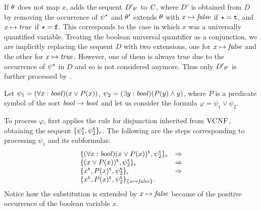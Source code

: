 If $\theta$ does not map $x$, \nfcnf{} adds the sequent ${D'}_{\theta'}$ to $\mathit{C}$, where $D'$ is obtained from $D$ by removing the occurrence of ${\psi}^{\star}$ and $\theta'$ extends $\theta$ with $x \mapsto \mathit{false}$ if $\star=\mathtt{t}$, and $x \mapsto \mathit{true}$ if $\star=\mathtt{f}$. 
This corresponds to the case in which $x$ was a universally quantified variable.
Treating the boolean universal quantifier as a conjunction, we are implicitly replacing the sequent $D$ with two extensions, one for $x \mapsto \mathit{false}$ and the other for $x \mapsto \mathit{true}$. However, one of them is always true due to the occurrence of ${\psi}^{\star}$ in $D$ and so is not considered anymore. Thus only ${D'}_{\theta'}$ is further processed by \nfcnf{}.

\begin{example*} Let $\psi_1 = (\forall x:\mathit{bool})(x \lor P(x))$, $\psi_2 = (\exists y:\mathit{bool})(P(y) \land y)$,
where $P$ is a predicate symbol of the sort $\mathit{bool} \to \mathit{bool}$ and let us consider the formula $\varphi = \psi_1 \lor \psi_2$.

To process $\varphi$, \nfcnf{} first applies the rule for disjunction inherited from $\textsc{VCNF}$,
obtaining the sequent $\{\psi_1^{\mathtt{t}}, \psi_2^{\mathtt{t}}\}_\epsilon$. The following are the steps corresponding to processing 
$\psi_1$ and its subformulas:
\[
\begin{array}{ll}
\{(\forall x:\mathit{bool})(x \lor P(x))^{\mathtt{t}}, \psi_2^{\mathtt{t}}\}_\epsilon & \Rightarrow \\
\{(x \lor P(x))^{\mathtt{t}}, \psi_2^{\mathtt{t}}\}_\epsilon & \Rightarrow \\
\{x^{\mathtt{t}}, P(x)^{\mathtt{t}}, \psi_2^{\mathtt{t}}\}_\epsilon & \Rightarrow \\
\{x^{\mathtt{t}}, P(x)^{\mathtt{t}}, \psi_2^{\mathtt{t}}\}_{\{x \mapsto \mathit{false}\}}.\\
\end{array}
\]
Notice how the substitution is extended by $x \mapsto \mathit{false}$ because of the positive occurrence of the boolean variable $x$.


\end{example*}
